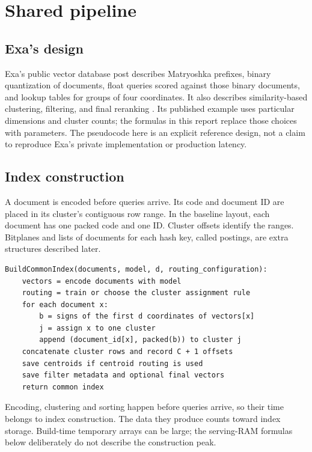 \section{Shared pipeline}
\label{sec:shared}
\subsection{Exa's design}
Exa's public vector database post describes Matryoshka prefixes, binary quantization of
documents, float queries scored against those binary documents, and lookup tables for groups
of four coordinates. It also describes similarity-based clustering, filtering, and final
reranking \cite{exa}. Its published example uses particular dimensions and cluster counts;
the formulas in this report replace those choices with parameters. The pseudocode here is an explicit
reference design, not a claim to reproduce Exa's private implementation or production latency.

\subsection{Index construction}
A document is encoded before queries arrive. Its code and document ID are placed in its
cluster's contiguous row range. In the baseline layout, each document
has one packed code and one ID. Cluster offsets identify the ranges. Bitplanes and lists of documents for each hash key, called postings, are extra structures
described later.

\par\noindent\begin{minipage}{\linewidth}
\begin{lstlisting}[caption={Common preprocessing; executed before serving queries.}]
BuildCommonIndex(documents, model, d, routing_configuration):
    vectors = encode documents with model
    routing = train or choose the cluster assignment rule
    for each document x:
        b = signs of the first d coordinates of vectors[x]
        j = assign x to one cluster
        append (document_id[x], packed(b)) to cluster j
    concatenate cluster rows and record C + 1 offsets
    save centroids if centroid routing is used
    save filter metadata and optional final vectors
    return common index
\end{lstlisting}
\end{minipage}\par

Encoding, clustering and sorting happen before queries arrive, so their time belongs to
index construction. The data they produce counts toward index storage. Build-time temporary arrays can be
large; the serving-RAM formulas below deliberately do not describe the construction peak.

